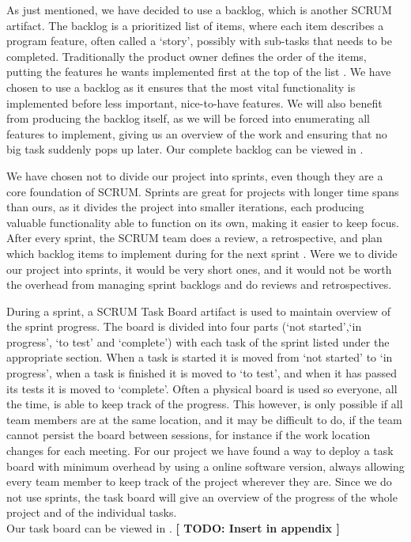 As just mentioned, we have decided to use a backlog, which is another SCRUM artifact.
The backlog is a prioritized list of items, where each item describes a program feature, often called a `story', possibly with sub-tasks that needs to be completed. Traditionally the product owner defines the order of the items, putting the features he wants implemented first at the top of the list \cite[p. 12]{scrum-org-guide}.
We have chosen to use a backlog as it ensures that the most vital functionality is implemented before less important, nice-to-have features. We will also benefit from producing the backlog itself, as we will be forced into enumerating all features to implement, giving us an overview of the work and ensuring that no big task suddenly pops up later.
Our complete backlog can be viewed in .

We have chosen not to divide our project into sprints, even though they are a core foundation of SCRUM.
Sprints are great for projects with longer time spans than ours, as it divides the project into smaller iterations, each producing valuable functionality able to function on its own, making it easier to keep focus.
After every sprint, the SCRUM team does a review, a retrospective, and plan which backlog items to implement during for the next sprint \cite[p. 8]{scrum-org-guide}.
Were we to divide our project into sprints, it would be very short ones, and it would not be worth the overhead from managing sprint backlogs and do reviews and retrospectives.

During a sprint, a SCRUM Task Board artifact is used to maintain overview of the sprint progress. The board is divided into four parts (`not started',`in progress', `to test' and `complete') with each task of the sprint listed under the appropriate section.
When a task is started it is moved from `not started' to `in progress', when a task is finished it is moved to `to test', and when it has passed its tests it is moved to `complete'.
Often a physical board is used so everyone, all the time, is able to keep track of the progress. This however, is only possible if all team members are at the same location, and it may be difficult to do, if the team cannot persist the board between sessions, for instance if the work location changes for each meeting.
For our project we have found a way to deploy a task board with minimum overhead by using a online software version, always allowing every team member to keep track of the project wherever they are. Since we do not use sprints, the task board will give an overview of the progress of the whole project and of the individual tasks.\\
Our task board can be viewed in . \textbf{[ TODO: Insert in appendix ]}

